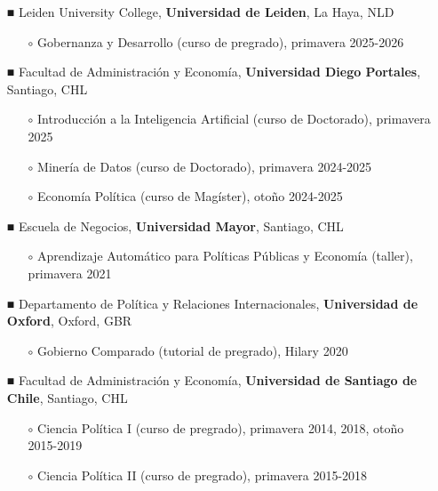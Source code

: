 \begin{publications}

\begin{itemize}
\item[{\scriptsize ■}]{\small Leiden University College, {\bfseries Universidad de Leiden}, La Haya, NLD}
\begin{itemize}
\item[$\circ$]{\small Gobernanza y Desarrollo (curso de pregrado), primavera 2025-2026}
\end{itemize} 
\end{itemize} 
\begin{itemize}
\item[{\scriptsize ■}]{\small Facultad de Administración y Economía, {\bfseries Universidad Diego Portales}, Santiago, CHL}
\begin{itemize}
\item[$\circ$]{\small Introducción a la Inteligencia Artificial (curso de Doctorado), primavera 2025}
\item[$\circ$]{\small Minería de Datos (curso de Doctorado), primavera 2024-2025}
\item[$\circ$]{\small Economía Política (curso de Magíster), otoño 2024-2025}
\end{itemize} 
\end{itemize} 
\begin{itemize}
\item[{\scriptsize ■}]{\small Escuela de Negocios, {\bfseries Universidad Mayor}, Santiago, CHL}
\begin{itemize}
\item[$\circ$]{\small Aprendizaje Automático para Políticas Públicas y Economía (taller), primavera 2021}
\end{itemize} 
\item[{\scriptsize ■}]{\small Departamento de Política y Relaciones Internacionales, {\bfseries Universidad de Oxford}, Oxford, GBR}
\begin{itemize}
\item[$\circ$]{\small Gobierno Comparado (tutorial de pregrado), Hilary 2020}
\end{itemize} 
\item[{\scriptsize ■}]{\small Facultad de Administración y Economía, {\bfseries Universidad de Santiago de Chile}, Santiago, CHL}
\begin{itemize}
\item[$\circ$]{\small Ciencia Política I (curso de pregrado), primavera 2014, 2018, otoño 2015-2019}
\item[$\circ$]{\small Ciencia Política II (curso de pregrado), primavera 2015-2018}

\end{itemize}
\end{itemize}
\end{publications}
